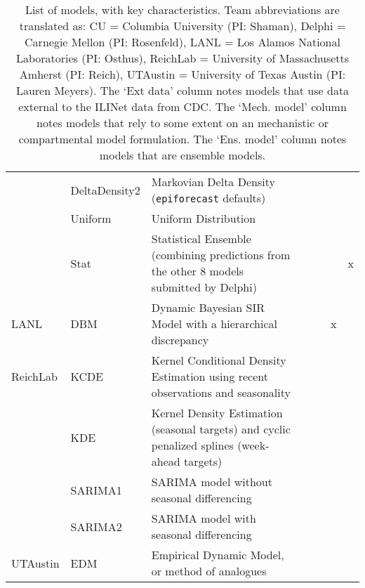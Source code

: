 \begin{table}
\begin{tabular}{p{1.6cm} l p{7.5cm} l  p{1cm}  p{1cm} p{1cm}}
~        & DeltaDensity2      & Markovian Delta Density ({\tt epiforecast} defaults)& \cite{Brooks2015a} & ~             & ~          &          \\ 
~        & Uniform            & Uniform Distribution&  & ~             & ~   &                 \\ 
~        & Stat               & Statistical Ensemble (combining predictions from the other 8 models submitted by Delphi)& & ~             & ~  & x                 \\
\hline
LANL     & DBM                & Dynamic Bayesian SIR Model with a hierarchical discrepancy & \cite{Osthus2017} & ~             & x      &              \\ 
\hline
ReichLab & KCDE               & Kernel Conditional Density Estimation using recent observations and seasonality & \cite{Ray2017}  & ~             & ~            &        \\ 
~        & KDE                & Kernel Density Estimation (seasonal targets) and cyclic penalized splines (week-ahead targets) & \cite{Ray2018}  & ~             & ~     &               \\ 
~        & SARIMA1            & SARIMA model without seasonal differencing & \cite{Ray2018} & ~             & ~      &              \\ 
~        & SARIMA2            & SARIMA model with seasonal differencing & \cite{Ray2018} & ~             & ~           &         \\ 
\hline
UTAustin & EDM                & Empirical Dynamic Model, or method of analogues & \cite{Sugihara1990} & ~             & ~         &           \\ 
\end{tabular}
\caption{List of models, with key characteristics. Team abbreviations are translated as: CU = Columbia University (PI: Shaman), Delphi = Carnegie Mellon (PI: Rosenfeld), LANL = Los Alamos National Laboratories (PI: Osthus), ReichLab = University of Massachusetts Amherst (PI: Reich), UTAustin = University of Texas Austin (PI: Lauren Meyers).  The `Ext data' column notes models that use data external to the ILINet data from CDC. The `Mech. model' column notes models that rely to some extent on an mechanistic or compartmental model formulation. The `Ens. model' column notes models that are ensemble models.}
\label{tab:model-list}
\end{table}